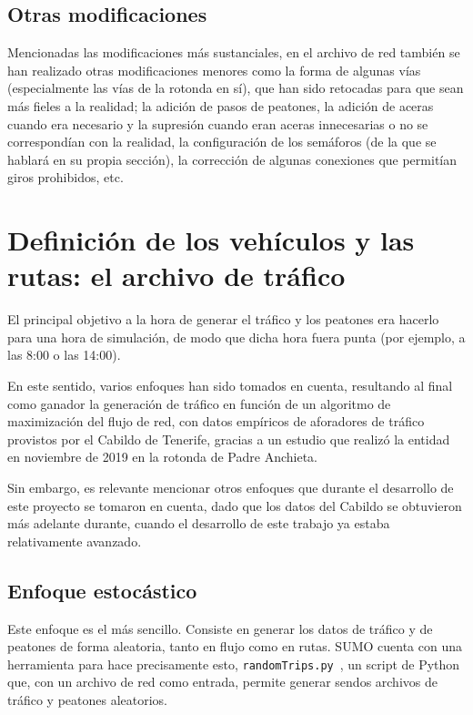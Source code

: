 \subsection{Otras modificaciones}

Mencionadas las modificaciones más sustanciales, en el archivo de red también se han realizado otras modificaciones menores como la forma de algunas vías (especialmente las vías de la rotonda en sí), que han sido retocadas para que sean más fieles a la realidad; la adición de pasos de peatones, la adición de aceras cuando era necesario y la supresión cuando eran aceras innecesarias o no se correspondían con la realidad, la configuración de los semáforos (de la que se hablará en su propia sección), la corrección de algunas conexiones que permitían giros prohibidos, etc.

\section{Definición de los vehículos y las rutas: el archivo de tráfico}
\label{sec:vehiculos}

El principal objetivo a la hora de generar el tráfico y los peatones era hacerlo para una hora de simulación, de modo que dicha hora fuera punta (por ejemplo, a las 8:00 o las 14:00).

En este sentido, varios enfoques han sido tomados en cuenta, resultando al final como ganador la generación de tráfico en función de un algoritmo de maximización del flujo de red, con datos empíricos de aforadores de tráfico provistos por el Cabildo de Tenerife, gracias a un estudio que realizó la entidad en noviembre de 2019 en la rotonda de Padre Anchieta. 

Sin embargo, es relevante mencionar otros enfoques que durante el desarrollo de este proyecto se tomaron en cuenta, dado que los datos del Cabildo se obtuvieron más adelante durante, cuando el desarrollo de este trabajo ya estaba relativamente avanzado.

\subsection{Enfoque estocástico}
\label{enfoque_estocastico}

Este enfoque es el más sencillo. Consiste en generar los datos de tráfico y de peatones de forma aleatoria, tanto en flujo como en rutas. SUMO cuenta con una herramienta para hace precisamente esto, \texttt{randomTrips.py}~\cite{noauthor_randomtripspy_nodate}, un script de Python que, con un archivo de red como entrada, permite generar sendos archivos de tráfico y peatones aleatorios.


